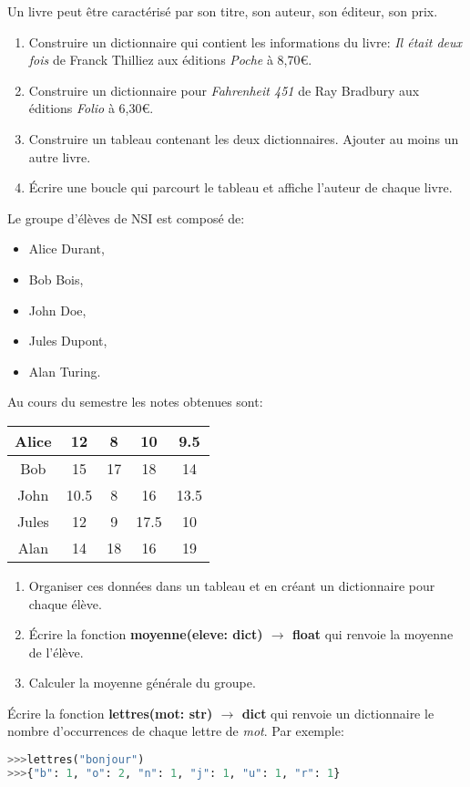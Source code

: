\documentclass[a4paper,11pt]{article}
\begin{document}
\begin{exo}Un livre peut être caractérisé par son titre, son auteur, son éditeur, son prix.
\begin{enumerate}
    \item Construire un dictionnaire qui contient les informations du livre: \emph{Il était deux fois} de Franck Thilliez aux éditions \emph{Poche} à 8,70€.
    \item Construire un dictionnaire pour \emph{Fahrenheit 451} de Ray Bradbury aux éditions \emph{Folio} à 6,30€.
    \item Construire un tableau contenant les deux dictionnaires. Ajouter au moins un autre livre.
    \item Écrire une boucle qui parcourt le tableau et affiche l'auteur de chaque livre.
\end{enumerate}
\end{exo}
\begin{exo}
Le groupe d'élèves de NSI est composé de:
\begin{itemize}
    \item Alice Durant,
    \item Bob Bois,
    \item John Doe,
    \item Jules Dupont,
    \item Alan Turing.
\end{itemize}
Au cours du semestre les notes obtenues sont:
\begin{center}
    \begin{tabular}{|c|*{4}{c}|}
        \hline
        Alice & 12 & 8 & 10 & 9.5 \\
        \hline
        Bob & 15 & 17 & 18 & 14  \\
        \hline
        John & 10.5 & 8 & 16 & 13.5  \\
        \hline
        Jules & 12 & 9 & 17.5 & 10  \\
        \hline
        Alan & 14 & 18 & 16 & 19  \\
        \hline
    \end{tabular}
\end{center}
\begin{enumerate}
    \item Organiser ces données dans un tableau et en créant un dictionnaire pour chaque élève.
    \item Écrire la fonction \textbf{moyenne(eleve: dict) $\rightarrow$ float} qui renvoie la moyenne de l'élève.
    \item Calculer la moyenne générale du groupe.
\end{enumerate}
\end{exo}
\begin{exo}
Écrire la fonction \textbf{lettres(mot: str) $\rightarrow$ dict} qui renvoie un dictionnaire le nombre d'occurrences de chaque lettre de \emph{mot}. Par exemple:
\begin{center}
\begin{lstlisting}[language=Python]
>>>lettres("bonjour")
>>>{"b": 1, "o": 2, "n": 1, "j": 1, "u": 1, "r": 1}
\end{lstlisting}
\label{ip}
\end{center}
\end{exo}
\end{document}
